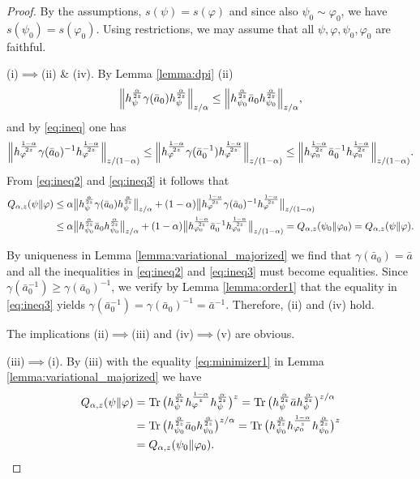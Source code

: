 \documentclass[12pt]{article}
\theoremstyle{definition}
\theoremstyle{remark}
\numberwithin{equation}{section}
\def \Tr{\mathrm{Tr}\,}
\def\ffi{\varphi}
\begin{document}
\begin{proof}
By the assumptions, $s(\psi)=s(\ffi)$ and since also $\psi_0\sim \ffi_0$, we have
$s(\psi_0)=s(\ffi_0)$. Using restrictions, we may assume that all
$\psi,\ffi,\psi_0,\ffi_0$ are faithful.


(i)$\implies$(ii) \& (iv).\enspace
By Lemma \ref{lemma:dpi} (ii) 
\begin{align}
\Big\|h_\psi^{\alpha\over2z}\gamma(\bar a_0)h_\psi^{\alpha\over2z}\Big\|_{z/\alpha}
\le\Big\|h_{\psi_0}^{\alpha\over2z}\bar a_0h_{\psi_0}^{\alpha\over2z}\Big\|_{z/\alpha},
\label{eq:ineq2}
\end{align}
and by \eqref{eq:ineq} one has
\begin{align}
\Big\|h_\ffi^{1-\alpha\over2z}\gamma(\bar a_0)^{-1}h_\ffi^{1-\alpha\over2z}\Big\|_{z/(1-\alpha)}
\le\Big\|h_\ffi^{1-\alpha\over2z}\gamma(\bar a_0^{-1})h_\ffi^{1-\alpha\over2z}\Big\|_{z/(1-\alpha)}
\le\Big\|h_{\ffi_0}^{1-\alpha\over2z}\bar
a_0^{-1}h_{\ffi_0}^{1-\alpha\over2z}\Big\|_{z/(1-\alpha)}. \label{eq:ineq3}
\end{align}
From \eqref{eq:ineq2} and \eqref{eq:ineq3} it follows that
\begin{align*}
Q_{\alpha,z}(\psi\|\ffi)&\le \alpha\big\|h_\psi^{\alpha\over2z}\gamma(\bar a_0)h_\psi^{\alpha\over2z}\big\|_{z/\alpha}
+(1-\alpha)\big\|h_\ffi^{1-\alpha\over2z}\gamma(\bar a_0)^{-1}h_\ffi^{1-\alpha\over2z}\big\|_{z/(1-\alpha)} \\
&\le\alpha\big\|h_{\psi_0}^{\alpha\over2z}\bar a_0h_{\psi_0}^{\alpha\over2z}\big\|_{z/\alpha}
+(1-\alpha)\big\|h_{\ffi_0}^{1-\alpha\over2z}\bar a_0^{-1}h_{\ffi_0}^{1-\alpha\over2z}\big\|_{z/(1-\alpha)} =Q_{\alpha,z}(\psi_0\|\ffi_0)=Q_{\alpha,z}(\psi\|\ffi).
\end{align*}


By uniqueness in Lemma \ref{lemma:variational_majorized} we find that $\gamma(\bar
a_0)=\bar a$ and all the inequalities in \eqref{eq:ineq2} and \eqref{eq:ineq3} must
become equalities. Since $\gamma(\bar a_0^{-1})\ge\gamma(\bar a_0)^{-1}$, we  verify by
Lemma \ref{lemma:order1} that the equality in
\eqref{eq:ineq3} yields $\gamma(\bar a_0^{-1})=\gamma(\bar a_0)^{-1}=\bar a^{-1}$. Therefore,
(ii) and (iv) hold.

The implications (ii)$\implies$(iii) and (iv)$\implies$(v) are obvious.

(iii)$\implies$(i).\enspace
By (iii) with the equality \eqref{eq:minimizer1} in Lemma \ref{lemma:variational_majorized} we have
\begin{align*}
Q_{\alpha,z}(\psi\|\ffi)
&=\Tr\bigl(h_\psi^{\alpha\over2z}h_\ffi^{1-\alpha\over z}h_\psi^{\alpha\over2z}\bigr)^z
=\Tr\bigl(h_\psi^{\alpha\over2z}\bar ah_\psi^{\alpha\over2z}\bigr)^{z/\alpha} \\
&=\Tr\bigl(h_{\psi_0}^{\alpha\over2z}\bar a_0h_{\psi_0}^{\alpha\over2z}\bigr)^{z/\alpha}
=\Tr\bigl(h_{\psi_0}^{\alpha\over2z}h_{\ffi_0}^{1-\alpha\over z}h_{\psi_0}^{\alpha\over2z}\bigr)^z \\
&=Q_{\alpha,z}(\psi_0\|\ffi_0).
\end{align*}


\end{proof}
\end{document}
